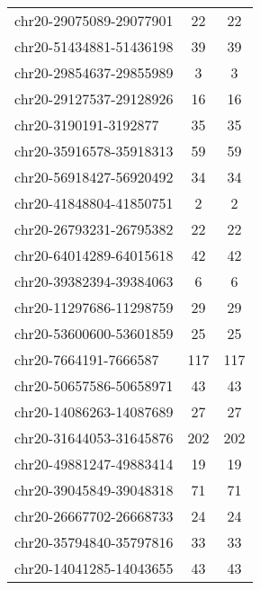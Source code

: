 \begin{longtable}{lSS}
	chr20-29075089-29077901 & 22     & 22                                        \\
	chr20-51434881-51436198 & 39     & 39                                        \\
	chr20-29854637-29855989 & 3      & 3                                         \\
	chr20-29127537-29128926 & 16     & 16                                        \\
	chr20-3190191-3192877   & 35     & 35                                        \\
	chr20-35916578-35918313 & 59     & 59                                        \\
	chr20-56918427-56920492 & 34     & 34                                        \\
	chr20-41848804-41850751 & 2      & 2                                         \\
	chr20-26793231-26795382 & 22     & 22                                        \\
	chr20-64014289-64015618 & 42     & 42                                        \\
	chr20-39382394-39384063 & 6      & 6                                         \\
	chr20-11297686-11298759 & 29     & 29                                        \\
	chr20-53600600-53601859 & 25     & 25                                        \\
	chr20-7664191-7666587   & 117    & 117                                       \\
	chr20-50657586-50658971 & 43     & 43                                        \\
	chr20-14086263-14087689 & 27     & 27                                        \\
	chr20-31644053-31645876 & 202    & 202                                       \\
	chr20-49881247-49883414 & 19     & 19                                        \\
	chr20-39045849-39048318 & 71     & 71                                        \\
	chr20-26667702-26668733 & 24     & 24                                        \\
	chr20-35794840-35797816 & 33     & 33                                        \\
	chr20-14041285-14043655 & 43     & 43                                        \\

\end{longtable}
